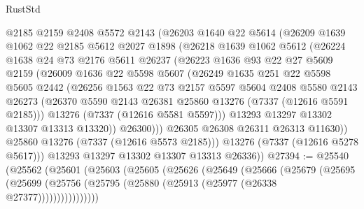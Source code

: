 \begin{lexlean}{RustStd}
\begin{coremodule}
            @2185
            @2159
            @2408
            @5572
            @2143
            (@26203
              @1640
              @22
              @5614
              (@26209
                @1639
                @1062
                @22
                @2185
                @5612
                @2027
                @1898
                (@26218
                  @1639
                  @1062
                  @5612
                  (@26224
                    @1638
                    @24
                    @73
                    @2176
                    @5611
                    @26237
                    (@26223
                      @1636
                      @93
                      @22
                      @27
                      @5609
                      @2159
                      (@26009
                        @1636
                        @22
                        @5598
                        @5607
                        (@26249
                          @1635
                          @251
                          @22
                          @5598
                          @5605
                          @2442
                          (@26256
                            @1563
                            @22
                            @73
                            @2157
                            @5597
                            @5604
                            @2408
                            @5580
                            @2143
                            @26273
                            (@26370 @5590 @2143 @26381 @25860 @13276 (@7337 (@12616 @5591 @2185)))
                            @13276
                            (@7337 (@12616 @5581 @5597)))
                          @13293
                          @13297
                          @13302
                          @13307
                          @13313
                          @13320))
                      @26300)))
                @26305
                @26308
                @26311
                @26313
                @11630))
            @25860
            @13276
            (@7337 (@12616 @5573 @2185)))
          @13276
          (@7337 (@12616 @5278 @5617)))
        @13293
        @13297
        @13302
        @13307
        @13313
        @26336))
@27394 := @25540
    (@25562
      (@25601
        (@25603
          (@25605
            (@25626
              (@25649
                (@25666
                  (@25679
                    (@25695
                      (@25699 (@25756 (@25795 (@25880 (@25913 (@25977 (@26338 @27377))))))))))))))))

\end{coremodule}
\end{lexlean}
